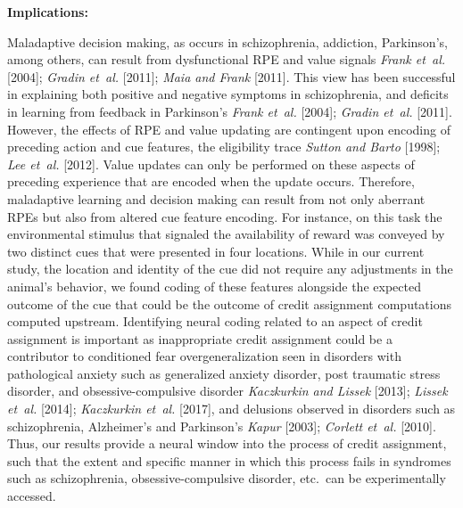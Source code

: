 \documentclass[11pt]{article}
\newcommand{\ldiffentity}[1]{#1}
\begin{document}
{\bf Implications:}

Maladaptive decision making, as occurs in schizophrenia, addiction,
Parkinson's, among others, can result from dysfunctional RPE and value
signals \ldiffentity{\textit{Frank et~al.} [\ldiffentity{2004}]}; \ldiffentity{\textit{Gradin et~al.} [\ldiffentity{2011}]}; \ldiffentity{\textit{Maia and Frank} [\ldiffentity{2011}]}. This view has been
successful in explaining both positive and negative symptoms in
schizophrenia, and deficits in learning from feedback in Parkinson's
\ldiffentity{\textit{Frank et~al.} [\ldiffentity{2004}]}; \ldiffentity{\textit{Gradin et~al.} [\ldiffentity{2011}]}. However, the effects of RPE and value
updating are contingent upon encoding of preceding action and cue
features, the eligibility trace \ldiffentity{\textit{Sutton and Barto} [\ldiffentity{1998}]}; \ldiffentity{\textit{Lee et~al.} [\ldiffentity{2012}]}. Value
updates can only be performed on these aspects of preceding experience
that are encoded when the update occurs. Therefore, maladaptive
learning and decision making can result from not only aberrant RPEs
but also from altered cue feature encoding. For instance, on this task
the environmental stimulus that signaled the availability of reward
was conveyed by two distinct cues that were presented in four
locations. While in our current study, the location and identity of
the cue did not require any adjustments in the animal’s behavior, we
found coding of these features alongside the expected outcome of the
cue that could be the outcome of credit assignment computations
computed upstream. Identifying neural coding related to an aspect of
credit assignment is important as inappropriate credit assignment
could be a contributor to conditioned fear overgeneralization seen in
disorders with pathological anxiety such as generalized anxiety
disorder, post traumatic stress disorder, and obsessive-compulsive
disorder \ldiffentity{\textit{Kaczkurkin and Lissek} [\ldiffentity{2013}]}; \ldiffentity{\textit{Lissek et~al.} [\ldiffentity{2014}]}; \ldiffentity{\textit{Kaczkurkin et~al.} [\ldiffentity{2017}]}, and
delusions observed in disorders such as schizophrenia, Alzheimer's and
Parkinson's \ldiffentity{\textit{Kapur} [\ldiffentity{2003}]}; \ldiffentity{\textit{Corlett et~al.} [\ldiffentity{2010}]}. Thus, our results provide a
neural window into the process of credit assignment, such that the
extent and specific manner in which this process fails in syndromes such as schizophrenia, obsessive-compulsive disorder,
etc.\ can be experimentally accessed.
\end{document}
